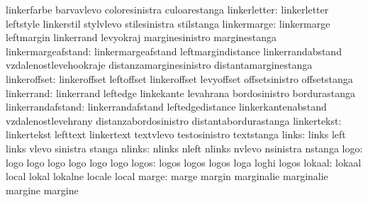                            linkerfarbe               barvavlevo
                           coloresinistra            culoarestanga
             linkerletter: linkerletter              leftstyle
                           linkerstil                stylvlevo
                           stilesinistra             stilstanga
              linkermarge: linkermarge               leftmargin
                           linkerrand                levyokraj
                           marginesinistro           marginestanga
       linkermargeafstand: linkermargeafstand        leftmargindistance
                           linkerrandabstand         vzdalenostlevehookraje
                           distanzamarginesinistro   distantamarginestanga
             linkeroffset: linkeroffset              leftoffset
                           linkeroffset              levyoffset
                           offsetsinistro            offsetstanga
               linkerrand: linkerrand                leftedge
                           linkekante                levahrana
                           bordosinistro             bordurastanga
        linkerrandafstand: linkerrandafstand         leftedgedistance
                           linkerkantenabstand       vzdalenostlevehrany
                           distanzabordosinistro     distantabordurastanga
              linkertekst: linkertekst               lefttext
                           linkertext                textvlevo
                           testosinistro             textstanga %
                    links: links                     left
                           links                     vlevo
                           sinistra                  stanga
                   nlinks: nlinks                    nleft
                           nlinks                    nvlevo
                           nsinistra                 nstanga
                     logo: logo                      logo
                           logo                      logo
                           logo                      logo
                    logos: logos                     logos
                           logos                     loga
                           loghi                     logos
                   lokaal: lokaal                    local
                           lokal                     lokalne
                           locale                    local
                    marge: marge                     margin
                           marginalie                marginalie
                           margine                   margine
